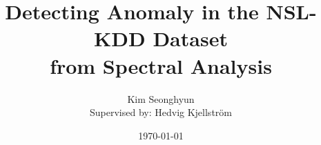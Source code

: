 \title{Detecting Anomaly in the NSL-KDD Dataset \\ from Spectral Analysis}

\author{Kim Seonghyun \\{\small Supervised by: Hedvig Kjellstr\"{o}m}}

\date{\today}
